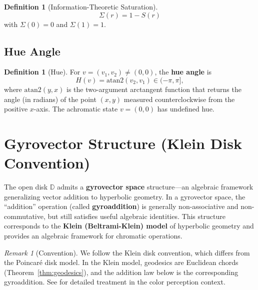 \documentclass[11pt]{article}
\theoremstyle{plain}
\theoremstyle{definition}
\newtheorem{definition}[theorem]{Definition}
\theoremstyle{remark}
\newtheorem{remark}[theorem]{Remark}
\newcommand{\D}{\mathbb{D}}
\begin{document}
\begin{definition}[Information-Theoretic Saturation]
\begin{equation}
\boxed{
\Sigma(r) = 1 - S(r)
}
\end{equation}
with $\Sigma(0) = 0$ and $\Sigma(1) = 1$.
\end{definition}

\subsection{Hue Angle}

\begin{definition}[Hue]
For $v = (v_1, v_2) \neq (0,0)$, the \textbf{hue angle} is 
\begin{equation}
H(v) = \mathrm{atan2}(v_2, v_1) \in (-\pi, \pi],
\end{equation}
where $\mathrm{atan2}(y, x)$ is the two-argument arctangent function that returns the angle (in radians) of the point $(x, y)$ measured counterclockwise from the positive $x$-axis. The achromatic state $v = (0,0)$ has undefined hue.
\end{definition}

\section{Gyrovector Structure (Klein Disk Convention)}
\label{sec:gyrovector}

The open disk $\D$ admits a \textbf{gyrovector space} structure---an algebraic framework generalizing vector addition to hyperbolic geometry. In a gyrovector space, the ``addition'' operation (called \textbf{gyroaddition}) is generally non-associative and non-commutative, but still satisfies useful algebraic identities. This structure corresponds to the \textbf{Klein (Beltrami-Klein) model} of hyperbolic geometry and provides an algebraic framework for chromatic operations.

\begin{remark}[Convention]
We follow the Klein disk convention, which differs from the Poincaré disk model. In the Klein model, geodesics are Euclidean chords (Theorem~\ref{thm:geodesics}), and the addition law below is the corresponding gyroaddition. See \cite{Berthier2020} for detailed treatment in the color perception context.
\end{remark}
\end{document}

